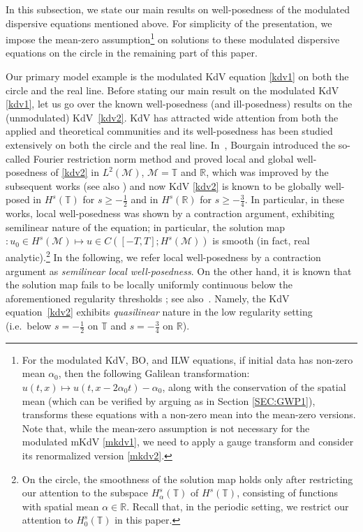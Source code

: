 \documentclass[letterpaper, 11pt,  reqno]{amsart}
\newcommand{\1}{\hspace{0.5mm}\text{I}\hspace{0.5mm}}
\newcommand{\R}{\mathbb{R}}
\newcommand{\T}{\mathbb{T}}
\newcommand{\al}{\alpha}
\newcommand{\M}{\mathcal{M}}
\numberwithin{equation}{section}
\numberwithin{theorem}{section}
\begin{document}
In this subsection, 
we state our main results on well-posedness
of the modulated dispersive equations mentioned above.
For simplicity of the presentation, 
we impose
the mean-zero assumption\footnote{For the modulated KdV, BO, and  ILW equations, 
if initial data has non-zero mean $\al_0$, then the following Galilean transformation:
$u(t, x)\mapsto u (t, x - 2\al_0t)-\al_0$, 
along with the conservation of the spatial mean (which can be verified
by arguing as in Section \ref{SEC:GWP1}), 
transforms
these equations with a non-zero mean into the mean-zero versions.
Note that, while  the mean-zero assumption is not necessary
for the modulated mKdV \eqref{mkdv1},
we need to apply a gauge transform and consider its renormalized version \eqref{mkdv2}.
}
 on solutions to
these modulated dispersive equations on the circle
in the remaining part of this paper.




Our primary model example  is the modulated KdV equation \eqref{kdv1}
on both the circle and the real line.
Before stating our main result on the modulated KdV \eqref{kdv1}, 
let us go over the known well-posedness (and ill-posedness) results
on the (unmodulated) KdV~\eqref{kdv2}.
KdV  has attracted wide attention 
from both the applied and theoretical communities
and its well-posedness has been studied
extensively on both the circle and the real line.
In~\cite{BO93}, 
Bourgain introduced the so-called
 Fourier restriction norm method
and proved local and global well-posedness of \eqref{kdv2}
in $L^2(\M)$, $\M = \T$ and $\R$,
which was
improved
by the subsequent works
\cite{KPV96, CKSTT03, Ki09, G09}
(see also \cite{BK})
and now KdV \eqref{kdv2}
is known to be 
globally well-posed
in $H^s(\T)$ for $s \ge - \frac 12$
and in $H^{s}(\R)$ for $s \ge -\frac 34$.
In particular, in these works, 
local well-posedness was shown by a contraction argument, 
exhibiting semilinear nature of the equation;
in particular, the solution map$: u_0\in H^s(\M)\mapsto u\in C([-T, T]; H^s(\M))$
is smooth (in fact, real analytic).\footnote{On the circle, 
the smoothness of the solution map holds
only after  restricting our attention to the subspace 
$H^s_\al(\T)$
of $H^s(\T)$, 
consisting of functions with spatial mean $\al \in \R$.
Recall that, in the periodic setting,  we restrict our attention to $H^s_0(\T)$
in this paper.}
In the following, we refer local well-posedness
by a contraction argument 
as {\it semilinear local well-posedness}.
On the other hand, it is known that the solution map
fails to be locally 
uniformly continuous below the aforementioned regularity thresholds
\cite{CCT}; see also~\cite{BO97}.
Namely,  the KdV equation~\eqref{kdv2} exhibits 
{\it quasilinear} nature in the low regularity setting
(i.e.~below $s = -\frac 12$ on $\T$
and $s=- \frac 34$ on $\R$). 
\end{document}
